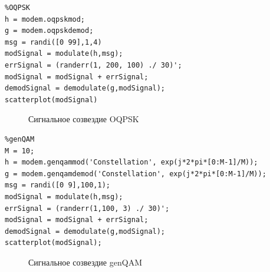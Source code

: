 \documentclass[10pt,a4paper,oneside]{article}
\begin{document}
\newpage
\begin{verbatim}
%OQPSK
h = modem.oqpskmod;
g = modem.oqpskdemod;
msg = randi([0 99],1,4)
modSignal = modulate(h,msg);
errSignal = (randerr(1, 200, 100) ./ 30)';
modSignal = modSignal + errSignal;
demodSignal = demodulate(g,modSignal);
scatterplot(modSignal)
\end{verbatim}
\begin{figure}[h]
	\caption{Сигнальное созвездие OQPSK}
\end{figure}

\newpage
\begin{verbatim}
%genQAM
M = 10;
h = modem.genqammod('Constellation', exp(j*2*pi*[0:M-1]/M));
g = modem.genqamdemod('Constellation', exp(j*2*pi*[0:M-1]/M));
msg = randi([0 9],100,1);
modSignal = modulate(h,msg);
errSignal = (randerr(1,100, 3) ./ 30)';
modSignal = modSignal + errSignal;
demodSignal = demodulate(g,modSignal);
scatterplot(modSignal);
\end{verbatim}
\begin{figure}[h]
	\caption{Сигнальное созвездие genQAM}
\end{figure}
\end{document}
